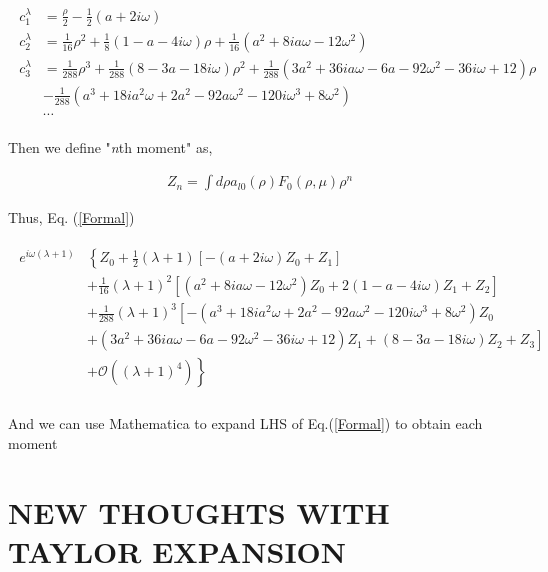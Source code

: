 \documentclass[11pt]{diazessay} %
\begin{document}
\begin{align}
    \begin{aligned}
    c_1^\lambda & =\frac{\rho}{2}-\frac{1}{2}(a+2 i \omega) \\
    c_2^\lambda & =\frac{1}{16} \rho^2+\frac{1}{8}(1-a-4 i \omega) \rho+\frac{1}{16}\left(a^2+8 i a \omega-12 \omega^2\right)\\
    c_3^\lambda & =\frac{1}{288} \rho^3+\frac{1}{288}(8-3 a-18 i \omega) \rho^2+\frac{1}{288}\left(3 a^2+36 i a \omega-6 a-92 \omega^2-36 i \omega+12\right) \rho \\
    & -\frac{1}{288}\left(a^3+18 i a^2 \omega+2 a^2-92 a \omega^2-120 i \omega^3+8 \omega^2\right)\\
    &\cdots 
    \end{aligned}
\end{align}

Then we define "\textit{n}th moment" as, 

\begin{align}
    Z_{n}=\int d \rho a_{l0}(\rho)F_{0}(\rho, \mu)\rho^{n}
\end{align}

Thus, Eq. (\ref{Formal}) 

\begin{align}
    \begin{aligned}
        e^{i \omega(\lambda+1)}&\left\{Z_0+\frac{1}{2}(\lambda+1)\left[-(a+2 i \omega) Z_0+Z_1\right]\right. \\
    &+\frac{1}{16}(\lambda+1)^2\left[\left(a^2+8 i a \omega-12 \omega^2\right) Z_0+2(1-a-4 i \omega) Z_1+Z_2\right] \\
    &+\frac{1}{288}(\lambda+1)^3\left[-\left(a^3+18 i a^2 \omega+2 a^2-92 a \omega^2-120 i \omega^3+8 \omega^2\right) Z_0\right. \\
    &\left.+\left(3 a^2+36 i a \omega-6 a-92 \omega^2-36 i \omega+12\right) Z_1+(8-3 a-18 i \omega) Z_2+Z_3\right] \\
    &\left.+\mathcal{O}\left((\lambda+1)^4\right)\right\} \\
    \end{aligned}
\end{align}

And we can use Mathematica to expand LHS of Eq.(\ref{Formal}) to obtain each moment



\section{NEW THOUGHTS WITH TAYLOR EXPANSION}
\end{document}

